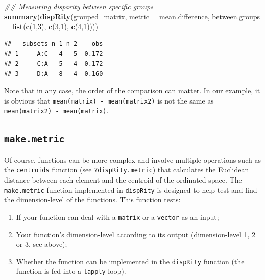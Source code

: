 \documentclass[
]{book}
\newenvironment{Shaded}{\begin{snugshade}}{\end{snugshade}}
\newcommand{\CommentTok}[1]{\textcolor[rgb]{0.56,0.35,0.01}{\textit{#1}}}
\newcommand{\DataTypeTok}[1]{\textcolor[rgb]{0.13,0.29,0.53}{#1}}
\newcommand{\DecValTok}[1]{\textcolor[rgb]{0.00,0.00,0.81}{#1}}
\newcommand{\KeywordTok}[1]{\textcolor[rgb]{0.13,0.29,0.53}{\textbf{#1}}}
\newcommand{\NormalTok}[1]{#1}
\providecommand{\tightlist}{%
  \setlength{\itemsep}{0pt}\setlength{\parskip}{0pt}}
\begin{document}
\begin{Shaded}
\begin{Highlighting}[]
\CommentTok{\#\# Measuring disparity between specific groups}
\KeywordTok{summary}\NormalTok{(}\KeywordTok{dispRity}\NormalTok{(grouped\_matrix, }\DataTypeTok{metric =}\NormalTok{ mean.difference,}
                 \DataTypeTok{between.groups =} \KeywordTok{list}\NormalTok{(}\KeywordTok{c}\NormalTok{(}\DecValTok{1}\NormalTok{,}\DecValTok{3}\NormalTok{), }\KeywordTok{c}\NormalTok{(}\DecValTok{3}\NormalTok{,}\DecValTok{1}\NormalTok{), }\KeywordTok{c}\NormalTok{(}\DecValTok{4}\NormalTok{,}\DecValTok{1}\NormalTok{))))}
\end{Highlighting}
\end{Shaded}

\begin{verbatim}
##   subsets n_1 n_2    obs
## 1     A:C   4   5 -0.172
## 2     C:A   5   4  0.172
## 3     D:A   8   4  0.160
\end{verbatim}

Note that in any case, the order of the comparison can matter.
In our example, it is obvious that \texttt{mean(matrix)\ -\ mean(matrix2)} is not the same as \texttt{mean(matrix2)\ -\ mean(matrix)}.

\hypertarget{makemetric}{%
\subsection{\texorpdfstring{\texttt{make.metric}}{make.metric}}\label{makemetric}}

Of course, functions can be more complex and involve multiple operations such as the \texttt{centroids} function (see \texttt{?dispRity.metric}) that calculates the Euclidean distance between each element and the centroid of the ordinated space.
The \texttt{make.metric} function implemented in \texttt{dispRity} is designed to help test and find the dimension-level of the functions.
This function tests:

\begin{enumerate}
\def\labelenumi{\arabic{enumi}.}
\tightlist
\item
  If your function can deal with a \texttt{matrix} or a \texttt{vector} as an input;
\item
  Your function's dimension-level according to its output (dimension-level 1, 2 or 3, see above);
\item
  Whether the function can be implemented in the \texttt{dispRity} function (the function is fed into a \texttt{lapply} loop).
\end{enumerate}
\end{document}
